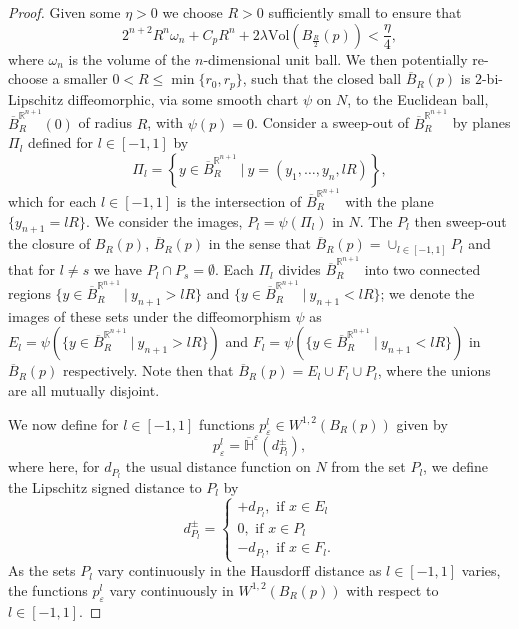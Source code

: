 \documentclass[11pt]{article}
\begin{document}
\begin{proof}
Given some $\eta > 0$ we choose $R > 0$ sufficiently small to ensure that
\begin{equation*}
     2^{n+2}R^n\omega_n + C_pR^n + 2\lambda \mathrm{Vol}(B_{\frac{R}{2}}(p)) < \frac{\eta}{4},
\end{equation*}
where $\omega_n$ is the volume of the $n$-dimensional unit ball. We then potentially re-choose a smaller $0 < R \leq \min\{r_0, r_p\}$, such that the closed ball $\overline{B}_R(p)$ is $2$-bi-Lipschitz diffeomorphic, via some smooth chart $\psi$ on $N$, to the Euclidean ball, $\overline{B}^{\mathbb{R}^{n+1}}_R(0)$ of radius $R$, with $\psi(p) = 0$. Consider a sweep-out of $\overline{B}^{\mathbb{R}^{n+1}}_R$ by planes $\Pi_l$ defined for $l \in [-1,1]$ by
\begin{equation*}
    \Pi_l = \left\{y \in \overline{B}^{\mathbb{R}^{n+1}}_R \: \Big| \: y = (y_1, \dots, y_n, lR) \right\},
\end{equation*}
which for each $l \in [-1,1]$ is the intersection of $\overline{B}^{\mathbb{R}^{n+1}}_R$ with the plane $\{ y_{n+1} = lR \}$. We consider the images, $P_l = \psi(\Pi_l)$ in $N$. The $P_l$ then sweep-out the closure of $B_R(p)$, $\overline{B}_R(p)$ in the sense that $\overline{B}_R(p) = \cup_{l \in [-1,1]} P_l$ and that for $l \neq s$ we have $P_l \cap P_s = \emptyset$. Each $\Pi_l$ divides $\overline{B}^{\mathbb{R}^{n+1}}_R$ into two connected regions $\{ y \in \overline{B}^{\mathbb{R}^{n+1}}_R \: | \: y_{n+1} > lR \}$ and $\{ y \in \overline{B}^{\mathbb{R}^{n+1}}_R \: | \: y_{n+1} < lR \}$; we denote the images of these sets under the diffeomorphism $\psi$ as $E_l = \psi(\{ y \in \overline{B}^{\mathbb{R}^{n+1}}_R \: | \: y_{n+1} > lR \})$ and $F_l = \psi(\{ y \in \overline{B}^{\mathbb{R}^{n+1}}_R \: | \: y_{n+1} < lR \})$ in $\overline{B}_R(p)$ respectively. Note then that $\overline{B}_R(p) = E_l \cup F_l \cup P_l$, where the unions are all mutually disjoint.

\bigskip

We now define for $l \in [-1,1]$ functions $p^l_\varepsilon \in W^{1,2}(B_R(p))$ given by
\begin{equation*}
    p^l_\varepsilon = \overline{\mathbb{H}}^\varepsilon(d^\pm_{P_l}),
\end{equation*}
where here, for $d_{P_l}$ the usual distance function on $N$ from the set $P_l$, we define the Lipschitz signed distance to $P_l$ by
\begin{equation*}
    d^\pm_{P_l} =
    \begin{cases}
    +d_{P_l}, \text{ if } x \in E_l\\
    0, \text{ if } x \in P_l\\
    -d_{P_l}, \text{ if } x \in F_l.
    \end{cases}
\end{equation*}
As the sets $P_l$ vary continuously in the Hausdorff distance as $l \in [-1,1]$ varies, the functions $p^l_\varepsilon$ vary continuously in $W^{1,2}(B_R(p))$ with respect to $l \in [-1,1]$. 


\end{proof}
\end{document}

